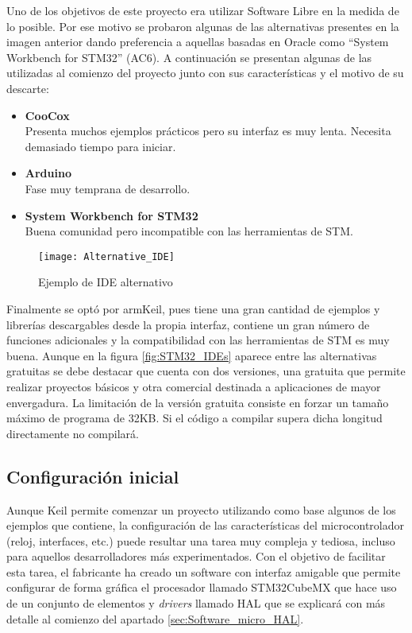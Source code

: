 Uno de los objetivos de este proyecto era utilizar Software Libre en la medida de lo posible. Por ese motivo se probaron algunas de las alternativas presentes en la imagen anterior dando preferencia a aquellas basadas en Oracle como ``System Workbench for STM32'' (AC6). A continuación se presentan algunas de las utilizadas al comienzo del proyecto junto con sus características y el motivo de su descarte:
\begin{itemize}
   \item \textbf{CooCox}\\
   Presenta muchos ejemplos prácticos pero su interfaz es muy lenta. Necesita demasiado tiempo para iniciar.
   \item \textbf{Arduino}\\
   Fase muy temprana de desarrollo.
   \item \textbf{System Workbench for STM32}
   \\Buena comunidad pero incompatible con las herramientas de STM.
\end{itemize}

\begin{figure} [h]
    \centering
    \texttt{[image: Alternative\_IDE]}
    \caption{Ejemplo de IDE alternativo}
    \label{fig:Alternative_IDE}
\end{figure}

Finalmente se optó por armKeil, pues tiene una gran cantidad de ejemplos y librerías descargables desde la propia interfaz, contiene un gran número de funciones adicionales y la compatibilidad con las herramientas de STM es muy buena. Aunque en la figura \ref{fig:STM32_IDEs} aparece entre las alternativas gratuitas se debe destacar que cuenta con dos versiones, una gratuita que permite realizar proyectos básicos y otra comercial destinada a aplicaciones de mayor envergadura. La limitación de la versión gratuita consiste en forzar un tamaño máximo de programa de 32KB. Si el código a compilar supera dicha longitud directamente no compilará.

\subsection{Configuración inicial\label{sec:Configuracion_micro}}

Aunque Keil permite comenzar un proyecto utilizando como base algunos de los ejemplos que contiene, la configuración de las características del microcontrolador (reloj, interfaces, etc.) puede resultar una tarea muy compleja y tediosa, incluso para aquellos desarrolladores más experimentados. Con el objetivo de facilitar esta tarea, el fabricante ha creado un software con interfaz amigable que permite configurar de forma gráfica el procesador llamado STM32CubeMX que hace uso de un conjunto de elementos y \textit{drivers} llamado \acrshort{HAL} que se explicará con más detalle al comienzo del apartado \ref{sec:Software_micro_HAL}.


